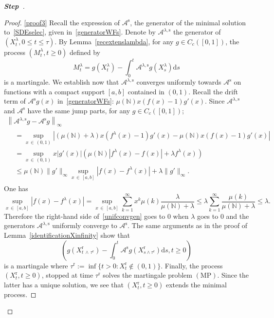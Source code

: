 \documentclass[10pt]{amsart}
\theoremstyle{definition}\newtheorem{defi}[theo]{Definition}\newtheorem{rema}[theo]{Remark}\newtheorem{exam}[theo]{Example}\newtheorem{exem}[theo]{Example}\newtheorem{nota}[theo]{Notation}
\newcommand{\ddr}{\mathrm{d}}
\newcommand{\rmr}{\mathrm{r}}
\newcommand{\rms}{\mathrm{s}}
\newcommand{\MP}{\mathrm{MP}}
\newcommand{\bbN}{\mathbb{N}}
\newcommand{\clA}{\mathcal{A}}
\newcounter{stepcount}
\newenvironment{step}{\refstepcounter{stepcount}\begin{proof}[\textbf{Step~\thestepcount}]}{\end{proof}}
\begin{document}
\begin{step}
\begin{proof}
\noindent\eqref{proof3} Recall the expression of $\clA^{\rms}$, the generator of the minimal solution to~\eqref{SDEselec}, given in~\eqref{generatorWFs}. Denote by $\clA^{\lambda,\rms}$ the generator of $(X_t^{\lambda},0\leq t\leq \tau)$. By Lemma~\ref{recextenslambda}, for any $g\in C_c([0,1])$, the process $(M_t^{\lambda},t\geq 0)$ defined by
\[
M_t^{\lambda}=g(X_t^{\lambda})-\int_{0}^{t}\clA^{\lambda, \rms}g(X_s^{\lambda})\ddr s
\]
is a martingale. We establish now that $\clA^{\lambda, \rms}$ converges uniformly towards $\clA^{\rms}$ on functions with a compact support $[a,b]$ contained in $(0,1)$. Recall the drift term of $\clA^{\rms}g(x)$ in~\eqref{generatorWFs}: $\mu(\bbN)x(f(x)-1)g'(x)$. Since $\clA^{\lambda, \rms}$ and $\clA^{\rms}$ have the same jump parts, for any $g\in C_c([0,1])$;
\begin{multline}\label{unifconvgen}
\left\|\clA^{\lambda, \rms}g-\clA^{\rms}g\right\|_\infty\\
\begin{aligned}
&=\underset{x\,\in\,(0,1)}{\sup}\left\lvert (\mu(\bbN)+\lambda)x\left(f^{\lambda}(x)-1\right)g'(x)-\mu(\bbN)x(f(x)-1)g'(x)\right \lvert \\
&=\underset{x\,\in\,(0,1)}{\sup}x|g'(x)|\left(\mu(\bbN)\left\lvert f^{\lambda}(x)-f(x)\right\lvert+\lambda f^{\lambda}(x)\right)\\
&\leq \mu(\bbN)\|g'\|_\infty \underset{x\,\in\,[a,b]}{\sup}\left|f(x)-f^{\lambda}(x)\right|+\lambda \|g'\|_\infty.
\end{aligned}
\end{multline}
One has
\[
\underset{x\,\in\,[a,b]}{\sup}\left|f(x)-f^{\lambda}(x)\right|=\underset{x\,\in\,[a,b]}{\sup}\sum_{k=1}^{\infty}x^{k}\mu(k)\frac{\lambda}{\mu(\bbN)+\lambda}\leq \lambda \sum_{k=1}^{\infty}\frac{\mu(k)}{\mu(\bbN)+\lambda}\leq \lambda.
\]
Therefore the right-hand side of~\eqref{unifconvgen} goes to $0$ when $\lambda$ goes to $0$ and the generators $\clA^{\lambda, \rms}$ uniformly converge to $\clA^{\rms}$. The same arguments as in the proof of Lemma~\ref{identificationXinfinity} show that
\[
\left(g\left(X^{\rmr}_{t\,\wedge\,\tau^{\rmr}}\right)-\int_{0}^{t}\clA^{\rms}g\left(X_{s\wedge \tau^{\rmr}}^{\rmr}\right)\ddr s, t\geq 0\right)
\]
is a martingale where $\tau^{\rmr}:=\inf\{t>0: X^{\rmr}_t\notin (0,1)\}$. Finally, the process $(X^{\rmr}_{t},t\geq 0)$, stopped at time $\tau^{\rmr}$ solves the martingale problem $(\MP)$. Since the latter has a unique solution, we see that $(X^{\rmr}_t,t\geq 0)$ extends the minimal process.
\end{proof}


\end{step}
\end{document}
